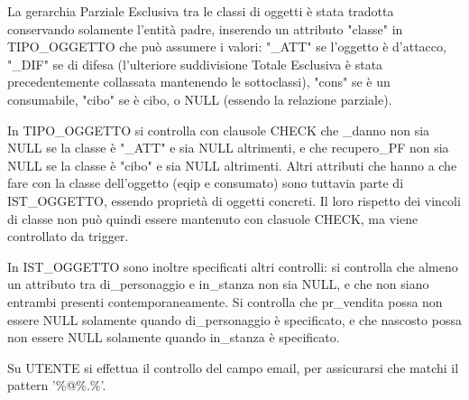 \documentclass[10pt,a4paper]{article}
\begin{document}
La gerarchia Parziale Esclusiva tra le classi di oggetti è stata tradotta conservando solamente l'entità padre, inserendo un attributo "classe" in TIPO\_OGGETTO   che può assumere i valori: "\_ATT" se l'oggetto è d'attacco, "\_DIF" se di difesa (l'ulteriore suddivisione Totale Esclusiva è stata precedentemente collassata mantenendo le sottoclassi), "cons" se è un consumabile, "cibo" se è cibo, o NULL (essendo la relazione parziale).

In TIPO\_OGGETTO si controlla con clausole CHECK che \_danno non sia NULL se la classe è "\_ATT" e sia NULL altrimenti, e che recupero\_PF non sia NULL se la classe è "cibo" e sia NULL altrimenti. Altri attributi che hanno a che fare con la classe dell'oggetto (eqip e consumato) sono tuttavia parte di IST\_OGGETTO, essendo proprietà di oggetti concreti. Il loro rispetto dei vincoli di classe non può quindi essere mantenuto con clasuole CHECK, ma viene controllato da trigger.

In IST\_OGGETTO sono inoltre specificati altri controlli: si controlla che almeno un attributo tra di\_personaggio e in\_stanza non sia NULL, e che non siano entrambi presenti contemporaneamente. Si controlla che pr\_vendita possa non essere NULL solamente quando di\_personaggio è specificato, e che nascosto possa non essere NULL solamente quando in\_stanza è specificato.

Su UTENTE si effettua il controllo del campo email, per assicurarsi che matchi il pattern '\%@\%.\%'.
\end{document}
